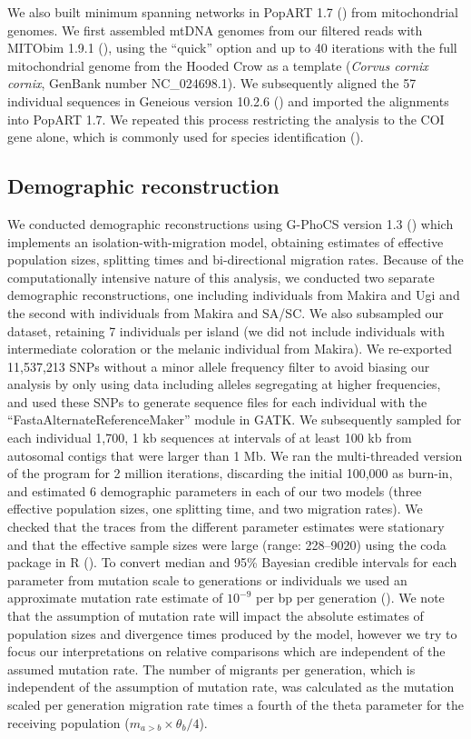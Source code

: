 We also built minimum spanning networks in PopART 1.7 (\cite{leigh2015popart,bandelt1999median}) from mitochondrial genomes. We first assembled mtDNA genomes from our filtered reads with MITObim 1.9.1 (\cite{hahn2013reconstructing}), using the “quick” option and up to 40 iterations with the full mitochondrial genome from the Hooded Crow as a template (\textit{Corvus cornix cornix}, GenBank number NC\_024698.1). We subsequently aligned the 57 individual sequences in Geneious version 10.2.6 (\cite{kearse2012geneious}) and imported the alignments into PopART 1.7. We repeated this process restricting the analysis to the COI gene alone, which is commonly used for species identification (\cite{hebert2003barcoding}).

\subsection{Demographic reconstruction} \label{dem-recon}
We conducted demographic reconstructions using G-PhoCS version 1.3 (\cite{gronau_bayesian_2011}) which implements an isolation-with-migration model, obtaining estimates of effective population sizes, splitting times and bi-directional migration rates. Because of the computationally intensive nature of this analysis, we conducted two separate demographic reconstructions, one including individuals from Makira and Ugi and the second with individuals from Makira and \ac{SA/SC}. We also subsampled our dataset, retaining 7 individuals per island (we did not include individuals with intermediate coloration or the melanic individual from Makira). We re-exported 11,537,213 \acsp{SNP} without a minor allele frequency filter to avoid biasing our analysis by only using data including alleles segregating at higher frequencies, and used these \acsp{SNP} to generate sequence files for each individual with the “FastaAlternateReferenceMaker” module in GATK. We subsequently sampled for each individual 1,700, 1 kb sequences at intervals of at least 100 kb from autosomal contigs that were larger than 1 Mb. We ran the multi-threaded version of the program for 2 million iterations, discarding the initial 100,000 as burn-in, and estimated 6 demographic parameters in each of our two models (three effective population sizes, one splitting time, and two migration rates). We checked that the traces from the different parameter estimates were stationary and that the effective sample sizes were large (range: 228–9020) using the coda package in R (\cite{plummer2006coda}). To convert median and 95\% Bayesian credible intervals for each parameter from mutation scale to generations or individuals we used an approximate mutation rate estimate of $10^{-9}$ per bp per generation (\cite{smeds2016direct}). We note that the assumption of mutation rate will impact the absolute estimates of population sizes and divergence times produced by the model, however we try to focus our interpretations on relative comparisons which are independent of the assumed mutation rate. The number of migrants per generation, which is independent of the assumption of mutation rate, was calculated as the mutation scaled per generation migration rate times a fourth of the theta parameter for the receiving population ($m_{a>b} \times \theta_b/4$).

